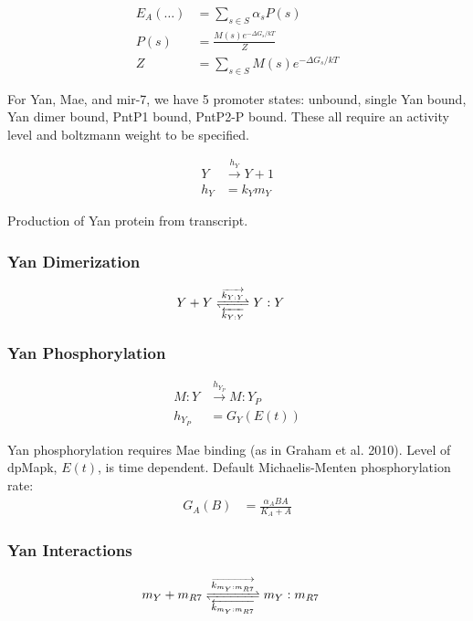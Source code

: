 \documentclass[12pt]{article}
\renewcommand{\(}{\left(}
\renewcommand{\)}{\right)}
\begin{document}
	\begin{align*}
		E_A(\dots) &= \sum_{s \in S} \alpha_s P(s) \\
		P(s) &= \frac{M(s)e^{-\Delta G_s /k T}}{Z} \\
		Z &= \sum_{s \in S} M(s)e^{-\Delta G_s / k T}
	\end{align*}
	
	For Yan, Mae, and mir-7, we have 5 promoter states: unbound, single Yan bound, Yan dimer bound, PntP1 bound, PntP2-P bound. These all require an activity level and boltzmann weight to be specified. 
	
	\begin{align}
		Y &\xrightarrow{h_Y} Y + 1 \\
		h_Y &= k_Y m_Y \nonumber
	\end{align}
	
	Production of Yan protein from transcript. 
	
	\subsubsection{Yan Dimerization}
	
	\begin{align}
		Y + Y &\ce{<=>[\overrightarrow{k_{Y:Y}}][\overleftarrow{k_{Y:Y}}]} Y:Y
	\end{align}

	\subsubsection{Yan Phosphorylation}
	
	\begin{align}
		M:Y &\xrightarrow{h_{Y_P}} M:Y_P \\
		h_{Y_P} &= G_Y(E(t)) \nonumber
	\end{align}	
	
	Yan phosphorylation requires Mae binding (as in Graham et al. 2010). Level of dpMapk, $E(t)$, is time dependent. Default Michaelis-Menten phosphorylation rate:
	\begin{align*}
		G_A(B) &= \frac{\alpha_A B A}{K_A + A}
	\end{align*}
	
	\subsubsection{Yan Interactions}
	\begin{align}
		m_Y + m_{R7} &\ce{<=>[\overrightarrow{k_{m_Y:m_{R7}}}][\overleftarrow{k_{m_Y:m_{R7}}}]} m_Y:m_{R7} 
	\end{align}
	
\end{document}
